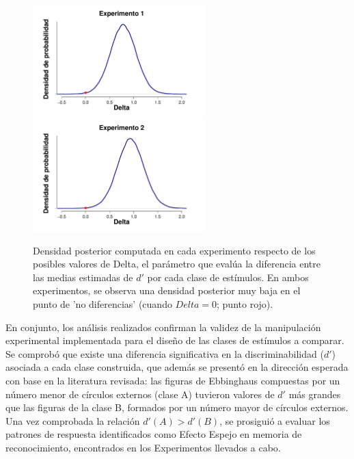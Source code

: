\begin{figure}[h]
\centering
\includegraphics[width=0.6\textwidth]{Figures/MDelta_DensidadDelta_E1}\\
\includegraphics[width=0.6\textwidth]{Figures/MDelta_DensidadDelta_E2}\\
\decoRule
\caption[Modelo Delta: Densidad posterior de los valores estimados para el parámetro Delta en cada Experimento]{Densidad posterior computada en cada experimento respecto de los posibles valores de Delta, el parámetro que evalúa la diferencia entre las medias estimadas de $d'$ por cada clase de estímulos. En ambos experimentos, se observa una densidad posterior muy baja en el punto de 'no diferencias' (cuando $Delta=0$; punto rojo).} 
\label{fig:Delta}
\end{figure}

En conjunto, los análisis realizados confirman la validez de la manipulación experimental implementada para el diseño de las clases de estímulos a comparar. Se comprobó que existe una diferencia significativa en la discriminabilidad ($d'$) asociada a cada clase construida, que además se presentó en la dirección esperada con base en la literatura revisada: las figuras de Ebbinghaus compuestas por un número menor de círculos externos (clase A) tuvieron valores de $d'$ más grandes que las figuras de la clase B, formados por un número mayor de círculos externos.\\

Una vez comprobada la relación $d'(A) > d'(B)$, se prosiguió a evaluar los patrones de respuesta identificados como Efecto Espejo en memoria de reconocimiento, encontrados en los Experimentos llevados a cabo.\\












